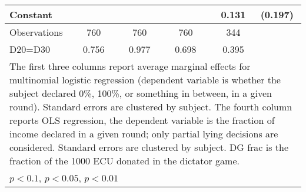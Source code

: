 \begin{tabular}{l|cccccc|cc}
Constant        &                  &         &                  &         &                  &         &    0.131         &  (0.197)\\
\hline
Observations    &      760         &         &      760         &         &      760         &         &      344         &         \\
D20=D30         &    0.756         &         &    0.977         &         &    0.698         &         &    0.395         &         \\
\hline\hline
\multicolumn{9}{p{16cm}}{\tiny The first three columns report average marginal effects for multinomial logistic regression (dependent variable is whether the subject declared 0\%,  100\%, or something in between, in a given round). Standard errors are clustered by subject. The fourth column reports OLS regression, the dependent variable is the fraction of income declared in a given round; only partial lying decisions are considered. Standard errors are clustered by subject. DG frac is the fraction of the 1000 ECU donated in the dictator game.}\\
\multicolumn{9}{l}{\tiny \sym{*} \(p<0.1\), \sym{**} \(p<0.05\), \sym{***} \(p<0.01\)}\\
\end{tabular}
